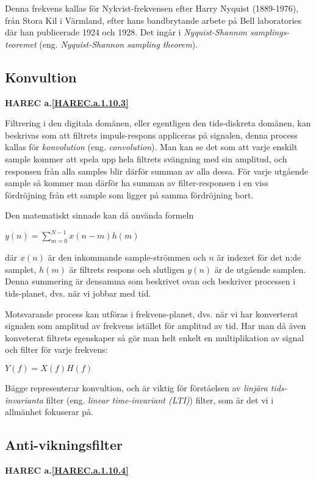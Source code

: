 Denna frekvens kallas för Nykvist-frekvensen efter Harry Nyquist (1889-1976),
från Stora Kil i Värmland, efter hans bandbrytande arbete på Bell laboratories
där han publicerade 1924 och 1928. Det ingår i \emph{Nyquist-Shannon samplings-
teoremet} (eng. \emph{Nyquist-Shannon sampling theorem}).

\subsection{Konvultion}
\textbf{HAREC a.\ref{HAREC.a.1.10.3}\label{myHAREC.a.1.10.3}}

Filtrering i den digitala domänen, eller egentligen den tids-diskreta domänen,
kan beskrivas som att filtrets impuls-respons appliceras på signalen, denna
process kallas för \emph{konvolution} (eng. \emph{convolution}). Man kan se det
som att varje enskilt sample kommer att spela upp hela filtrets svängning med
sin amplitud, och responsen från alla samples blir därför summan av alla dessa.
För varje utgående sample så kommer man därför ha summan av filter-responsen
i en viss fördröjning från ett sample som ligger på samma fördröjning bort.

Den matematiskt sinnade kan då använda formeln

\(y(n) = \sum_{m=0}^{N-1} x(n-m)h(m)\)

där \(x(n)\) är den inkommande sample-strömmen och \(n\) är indexet för det
n:de samplet, \(h(m)\) är filtrets respons och slutligen \(y(n)\) är de utgående
samplen. Denna summering är densamma som beskrivet ovan och beskriver processen
i tids-planet, dvs. när vi jobbar med tid.

Motsvarande process kan utföras i frekvens-planet, dvs. när vi har konverterat
signalen som amplitud av frekvens istället för amplitud av tid. Har man då
även konveterat filtrets egenskaper så gör man helt enkelt en multiplikation av
signal och filter för varje frekvens:

\(Y(f) = X(f)H(f)\)

Bägge representerar konvultion, och är viktig för förståelsen av \emph{linjära
tids-invarianta} filter (eng. \emph{linear time-invariant (LTI)}) filter,
som är det vi i allmänhet fokuserar på.

\subsection{Anti-vikningsfilter}
\textbf{HAREC a.\ref{HAREC.a.1.10.4}\label{myHAREC.a.1.10.4}}

